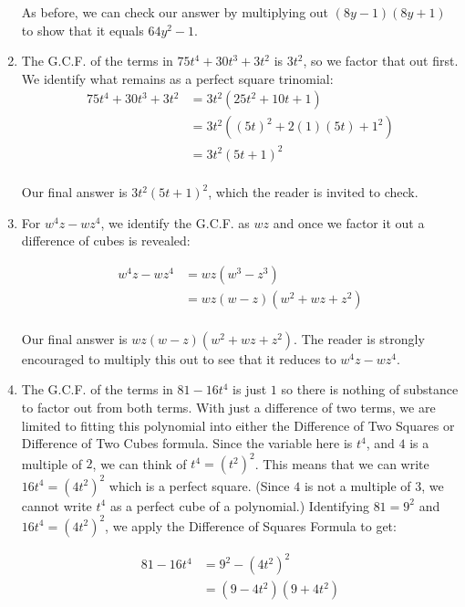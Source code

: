 \begin{ex}
\begin{enumerate}
As before, we can check our answer by multiplying out $(8y-1)(8y+1)$ to show that it equals $64y^2 - 1$.

\item  The G.C.F. of the terms in $75t^4 + 30t^3 + 3t^2$ is $3t^2$, so we factor that out first.  We identify what remains as a perfect square trinomial:
\begin{align*}
75t^4 + 30t^3 + 3t^2 & = 3t^2 (25t^2+10t + 1) \tag{Factor out G.C.F.}\\
& = 3t^2 ((5t)^2 + 2(1)(5t) + 1^2) \\
& = 3t^2 (5t+1)^2 \tag{Perfect Square Trinomial, $a = 5t$, $b = 1$} \\
\end{align*}

Our final answer is $3t^2 (5t+1)^2$, which the reader is invited to check.

\item  For $w^4 z - w z^4$, we identify the G.C.F. as $wz$ and once we factor it out a difference of cubes is revealed:

\begin{align*}
w^4 z - w z^4 & = wz(w^3 - z^3) \tag{Factor out G.C.F.} \\
& = wz(w-z)(w^2+wz+z^2) \tag{Difference of Cubes, $a=w$, $b = z$} \\
\end{align*}

Our final answer is $wz(w-z)(w^2+wz+z^2)$.  The reader is strongly encouraged to multiply this out to see that it reduces to $w^4 z - w z^4$.

\item  The G.C.F. of the terms in $81 - 16t^4$ is just $1$ so there is nothing of substance to factor out from both terms.  With just a difference of two terms, we are limited to fitting this polynomial into either the Difference of Two Squares or Difference of Two Cubes formula. Since the variable here is $t^4$, and $4$ is a multiple of $2$, we can think of $t^4 = (t^2)^2$.  This means that we can write $16t^4 = (4t^2)^2$ which is a perfect square.  (Since $4$ is not a multiple of $3$, we cannot write $t^4$ as a perfect cube of a polynomial.)  Identifying $81 = 9^2$ and $16t^4 = (4t^2)^2$, we apply the Difference of Squares Formula to get:

\begin{align*}
81 - 16t^4 & = 9^2 - (4t^2)^2 \\
& = (9-4t^2)(9+4t^2) \tag{Difference of Squares, $a = 9$, $b = 4t^2$} \\
\end{align*}


\end{enumerate}
\end{ex}
